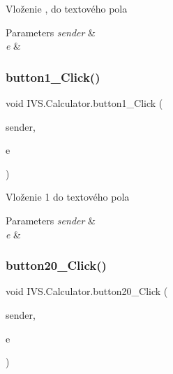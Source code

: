 Vloženie \textquotesingle{},\textquotesingle{} do textového pola 


\begin{DoxyParams}{Parameters}
{\em sender} & \\
\hline
{\em e} & \\
\hline
\end{DoxyParams}
\mbox{\label{class_i_v_s_1_1_calculator_acb35f01364be2f89cd6615bfe6b90725}} 
\subsubsection{\texorpdfstring{button1\+\_\+\+Click()}{button1\_Click()}}
{\footnotesize\ttfamily void I\+V\+S.\+Calculator.\+button1\+\_\+\+Click (\begin{DoxyParamCaption}\item[{object}]{sender,  }\item[{Event\+Args}]{e }\end{DoxyParamCaption})\hspace{0.3cm}{\ttfamily [protected]}}



Vloženie \textquotesingle{}1\textquotesingle{} do textového pola 


\begin{DoxyParams}{Parameters}
{\em sender} & \\
\hline
{\em e} & \\
\hline
\end{DoxyParams}
\mbox{\label{class_i_v_s_1_1_calculator_abb0b26c38b19fed222be5905a63db4fa}} 
\subsubsection{\texorpdfstring{button20\+\_\+\+Click()}{button20\_Click()}}
{\footnotesize\ttfamily void I\+V\+S.\+Calculator.\+button20\+\_\+\+Click (\begin{DoxyParamCaption}\item[{object}]{sender,  }\item[{Event\+Args}]{e }\end{DoxyParamCaption})\hspace{0.3cm}{\ttfamily [protected]}}



